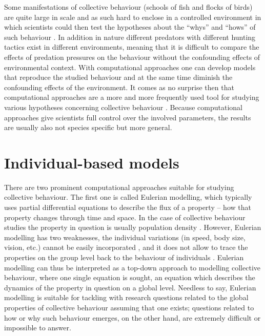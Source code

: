 Some manifestations of collective behaviour (\eg schools of fish and flocks of birds) are quite large in scale and as such hard to enclose in a controlled environment in which scientists could then test the hypotheses about the ``whys'' and ``hows'' of such behaviour \cite{lebarbajec2009organized}. In addition in nature different predators with different hunting tactics exist in different environments, meaning that it is difficult to compare the effects of predation pressures on the behaviour without the confounding effects of environmental context. With computational approaches one can develop models that reproduce the studied behaviour and at the same time diminish the confounding effects of the environment. It comes as no surprise then that computational approaches are a more and more frequently used tool for studying various hypotheses concerning collective behaviour \cite{vicsek1995novel,couzin2002collective,hildenbrandt2010selforganized}. Because computational approaches give scientists full control over the involved parameters, the results are usually also not species specific but more general.

\section{Individual-based models}

There are two prominent computational approaches suitable for studying collective behaviour. The first one is called Eulerian modelling, which typically uses partial differential equations to describe the flux of a property -- how that property changes through time and space. In the case of collective behaviour studies the property in question is usually population density \cite{kunz2011implications}. However, Eulerian modelling has two weaknesses, the individual variations (\eg in speed, body size, vision, etc.) cannot be easily incorporated \cite{gautrais2008keybehavioural}, and it does not allow to trace the properties on the group level back to the behaviour of individuals \cite{deangelis2005individualbased}. Eulerian modelling can thus be interpreted as a top-down approach to modelling collective behaviour, where one single equation is sought, an equation which describes the dynamics of the property in question on a global level. Needless to say, Eulerian modelling is suitable for tackling with research questions related to the global properties of collective behaviour assuming that one exists; questions related to how or why such behaviour emerges, on the other hand, are extremely difficult or impossible to answer.

